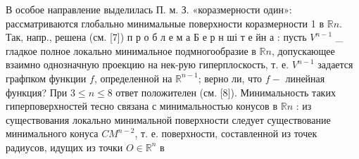 \documentclass[10pt]{article}
\begin{document}
В особое направление выделилась П. м. З. «коразмерности один»: рассматриваются глобально минимальные поверхности коразмерности 1 в $\mathbb{R} n$. Так, напр., решена (см. [7]) п р о б л е м а Б е р н ші т е йн а : пусть $V^{n-1}$ \_ гладкое полное локально минимальное подмногообразие в $\mathbb{R} n$, допускающее взаимно однозначную проекцию на нек-рую гиперплоскость, т. е. $V^{n-1}$ задается графпком функции $f$, определенной на $\mathbb{R}^{n-1}$; верно ли, что $f-$ линейная функция? При $3 \leqslant n \leqslant 8$ ответ положителен (см. [8]). Минимальность таких гиперповерхностей тесно связана с минимальностью конусов в $\mathbb{R} n$ : из существования локально минимальной поверхности следует существование минимального конуса $C M^{n-2}$, т. е. поверхности, составленной из точек радиусов, идущих из точки $O \in \mathbb{R}^{n}$ в
\end{document}

